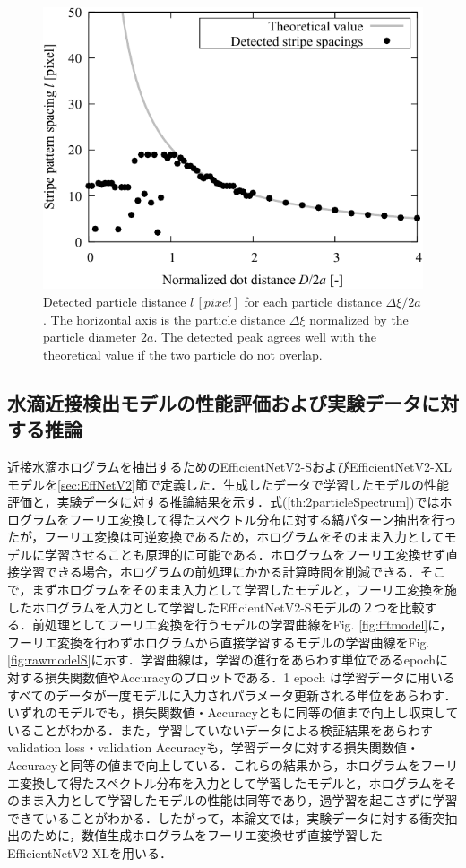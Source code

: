 \begin{figure}[H]
    \centering
    \includegraphics[width=0.75\linewidth]{./Figure/4_Results/stripe_pattern_experiment/stripe_pattern_exp_final_result.pdf}
    \caption{Detected particle distance $l\, \si{[pixel]}$ for each particle distance $\Delta \xi / 2a$. The horizontal axis is the particle distance $\Delta \xi$ normalized by the particle diameter $2a$. The detected peak agrees well with the theoretical value if the two particle do not overlap.}
    \label{fig:stripePatternDetection}
\end{figure}



\subsection{水滴近接検出モデルの性能評価および実験データに対する推論}\label{sec:modelEvalResult}
近接水滴ホログラムを抽出するためのEfficientNetV2-SおよびEfficientNetV2-XLモデルを\ref{sec:EffNetV2}節で定義した．生成したデータで学習したモデルの性能評価と，実験データに対する推論結果を示す．式(\ref{th:2particleSpectrum})ではホログラムをフーリエ変換して得たスペクトル分布に対する縞パターン抽出を行ったが，フーリエ変換は可逆変換であるため，ホログラムをそのまま入力としてモデルに学習させることも原理的に可能である．ホログラムをフーリエ変換せず直接学習できる場合，ホログラムの前処理にかかる計算時間を削減できる．そこで，まずホログラムをそのまま入力として学習したモデルと，フーリエ変換を施したホログラムを入力として学習したEfficientNetV2-Sモデルの２つを比較する．前処理としてフーリエ変換を行うモデルの学習曲線をFig. \ref{fig:fftmodel}に，フーリエ変換を行わずホログラムから直接学習するモデルの学習曲線をFig. \ref{fig:rawmodelS}に示す．学習曲線は，学習の進行をあらわす単位であるepochに対する損失関数値やAccuracyのプロットである．1 epoch は学習データに用いるすべてのデータが一度モデルに入力されパラメータ更新される単位をあらわす．いずれのモデルでも，損失関数値・Accuracyともに同等の値まで向上し収束していることがわかる．また，学習していないデータによる検証結果をあらわすvalidation loss・validation Accuracyも，学習データに対する損失関数値・Accuracyと同等の値まで向上している．これらの結果から，ホログラムをフーリエ変換して得たスペクトル分布を入力として学習したモデルと，ホログラムをそのまま入力として学習したモデルの性能は同等であり，過学習を起こさずに学習できていることがわかる．したがって，本論文では，実験データに対する衝突抽出のために，数値生成ホログラムをフーリエ変換せず直接学習したEfficientNetV2-XLを用いる．

